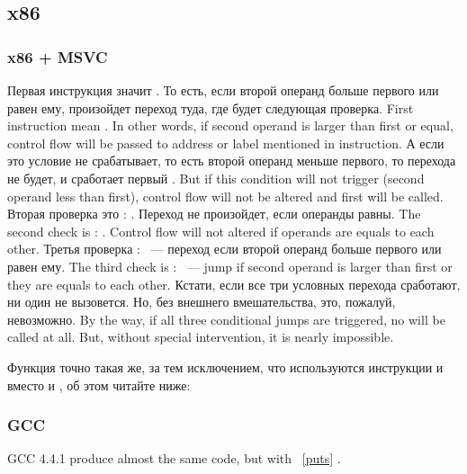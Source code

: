 ﻿\subsection{x86}

\subsubsection{x86 + MSVC}




\IFRU
{Первая инструкция \JLE значит . То есть, если второй операнд больше первого или 
равен ему, произойдет переход туда, где будет следующая проверка.}
{First instruction \JLE mean . In other words, if second operand is 
larger than first or equal, control flow will be passed to address or label mentioned in instruction.}
\IFRU
{А если это условие не срабатывает, то есть второй операнд меньше первого, то перехода не будет, 
и сработает первый \printf.}
{But if this condition will not trigger (second operand less than first), control flow will 
not be altered and first \printf will be called.}
\IFRU
{Вторая проверка это \JNE: . Переход не произойдет, если операнды равны.}
{The second check is \JNE: . Control flow will not altered if operands are 
equals to each other.}
\IFRU
{Третья проверка \JGE:  ~--- переход если второй операнд больше 
первого или равен ему.}
{The third check is \JGE:  ~--- jump if second operand is larger 
than first or they are equals to each other.}
\IFRU
{Кстати, если все три условных перехода сработают, ни один \printf не вызовется. 
Но, без внешнего вмешательства, это, пожалуй, невозможно.}
{By the way, if all three conditional jumps are triggered, no \printf will be called at all. 
But, without special intervention, it is nearly impossible.}

Функция  точно такая же, за тем исключением, что используются инструкции 
\JBE и \JAE вместо \JLE и \JGE, об этом читайте ниже:

\subsubsection{GCC}

GCC 4.4.1 
{produce almost the same code, but with} \puts~\ref{puts}  \printf.

